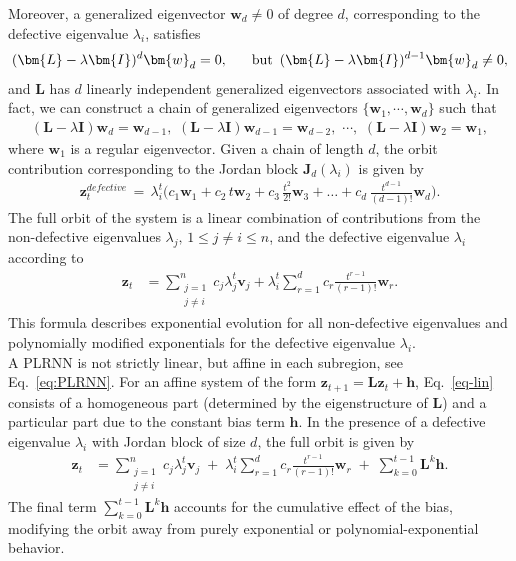 \documentclass{article}
\theoremstyle{example}
\theoremstyle{plain}
\theoremstyle{definition}
\theoremstyle{remark}
\def\eqref#1{equation~\ref{#1}}
\def\vh{{\bm{h}}}
\def\vv{{\bm{v}}}
\def\vw{{\bm{w}}}
\def\vz{{\bm{z}}}
\def\mI{{\bm{I}}}
\def\mJ{{\bm{J}}}
\def\mL{{\bm{L}}}
\renewcommand{\eqref}[1]{Eq.~\ref{#1}}
\begin{document}
Moreover, a generalized eigenvector $\vw_d \neq 0$ of degree $d$, corresponding to the defective eigenvalue $\lambda_i$, satisfies
\begin{align}
(\mL - \lambda \mI)^d \vw_d = 0,  \hspace{.6cm} \text{but} \, \, \, 
(\mL - \lambda \mI)^{d-1} \vw_d \neq 0,
\end{align}
and $\mL$ has $d$ linearly independent generalized eigenvectors associated with $\lambda_i$. In fact, we can construct a chain of generalized eigenvectors $\{\vw_1, \cdots, \vw_d   \}$ such that
\begin{align}
 (\mL - \lambda \mI) \vw_d = \vw_{d-1}, \, \, (\mL - \lambda \mI) \vw_{d-1} = \vw_{d-2}, \, \, \cdots, \, \,  (\mL - \lambda \mI) \vw_2 = \vw_{1},     
\end{align}
where $\vw_1$ is a regular eigenvector. Given a chain of length $d$, the orbit contribution corresponding to the Jordan block $\mJ_d (\lambda_i)$ is given by 
\begin{align}
    \vz_t^{defective} \, = \, \lambda_i^t \Big( c_1 \vw_1 + c_2 \, t  \vw_2 +  c_3 
 \, \frac{t^2}{2!}\vw_3 + \dots + c_d  \, \frac{t^{d-1}}{(d-1)!} \vw_d \Big).    
\end{align}
The full orbit of the system is a linear combination of contributions from the non-defective eigenvalues $\lambda_j, \, 1 \leq j \neq i \leq n$, and the defective eigenvalue $\lambda_i$ according to 
\begin{align}\label{eq-lin}
\vz_t & = \sum_{\substack{j=1 \\ j \neq i}}^{n} c_j \lambda_j^t \vv_j + \lambda_i^t \sum_{r=1}^{d} c_r \frac{t^{r-1}}{(r-1)!} \vw_r.
\end{align}
This formula describes exponential evolution for all non-defective eigenvalues and polynomially modified exponentials for the defective eigenvalue $\lambda_i$. \\

A PLRNN is not strictly linear, but affine in each subregion, see \eqref{eq:PLRNN}. For an affine system of the form $\vz_{t+1} = \mL \vz_t + \vh$, \eqref{eq-lin} consists of a homogeneous part (determined by the eigenstructure of $\mL$) and a particular part due to the constant bias term $\vh$. In the presence of a defective eigenvalue $\lambda_i$ with Jordan block of size $d$, the full orbit is given by
\begin{align}
\vz_t 
&= \sum_{\substack{j=1 \\ j \neq i}}^{n} c_j \lambda_j^t \vv_j 
\;+\; 
\lambda_i^t \sum_{r=1}^{d} c_r \frac{t^{r-1}}{(r-1)!} \vw_r 
\;+\;
\sum_{k=0}^{t-1} \mL^k \vh.
\end{align}
The final term $\sum_{k=0}^{t-1} \mL^k \vh$ accounts for the cumulative effect of the bias, modifying the orbit away from purely exponential or polynomial-exponential behavior.
\end{document}
